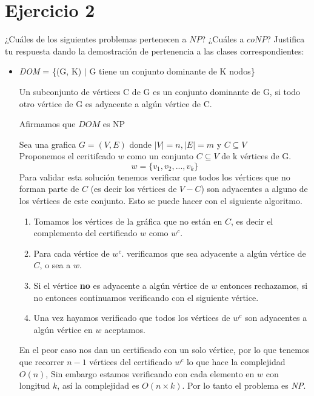 \documentclass[12pt,letterpaper]{article}
\begin{document}
\section*{Ejercicio 2}
¿Cuáles de los siguientes problemas pertenecen a $NP$? ¿Cuáles a $coNP$? Justifica tu respuesta dando la demostración de pertenencia a las clases correspondientes:

\begin{itemize}
    \item \textit{DOM} = \{(G, K) $|$ G tiene un conjunto dominante de K nodos\}
    
    Un subconjunto de vértices C de G es un conjunto dominante de G, si todo otro vértice de G es adyacente a algún vértice de C.

    Afirmamos que $DOM$ es NP
    
    Sea una grafica $G = (V,E)$ donde $|V|=n, |E|=m$ y $C \subseteq V$\\ 
    Proponemos el ceritifcado $w$ como un conjunto $C\subseteq V$ de k vértices de G.
    $$w = \{v_1, v_2, ..., v_k\}$$
    \newpage
    Para validar esta solución tenemos verificar que todos los vértices que no forman parte de $C$ (es decir los vértices de $V-C$) son adyacentes a alguno de los vértices de este conjunto. Esto se puede hacer con el siguiente algoritmo. %
    \begin{enumerate}
        \item Tomamos los vértices de la gráfica que no están en $C$, es decir el complemento del certificado $w$ como $w^c$.
        
        \item Para cada vértice de $w^c$. verificamos que sea adyacente a algún vértice de $C$, o sea a $w$.
        
        \item Si el vértice \textbf{no} es adyacente a algún vértice de $w$ entonces rechazamos, si no entonces continuamos verificando con el siguiente vértice.
        
        \item Una vez hayamos verificado que todos los vértices de $w^c$ son adyacentes a algún vértice en $w$ aceptamos.
    \end{enumerate}

    En el peor caso nos dan un certificado con un solo vértice, por lo que tenemos que recorrer $n-1$ vértices del certificado $w^c$ lo que hace la complejidad $O(n)$, Sin embargo estamos verificando con cada elemento en $w$ con longitud $k$, así la complejidad es $O(n \times k)$. Por lo tanto el problema es \textit{NP}.


\end{itemize}
\end{document}
